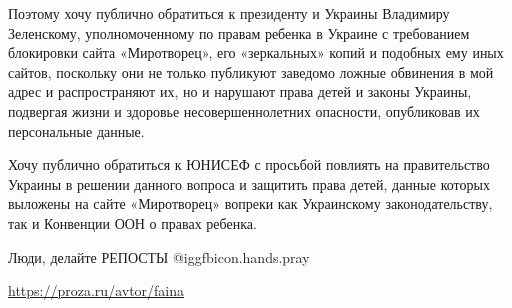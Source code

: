 Поэтому хочу публично обратиться к президенту и Украины Владимиру Зеленскому,
уполномоченному по правам ребенка в Украине с требованием блокировки сайта
«Миротворец», его «зеркальных» копий и подобных ему иных сайтов, поскольку они
не только публикуют заведомо ложные обвинения в мой адрес и распространяют их,
но и нарушают права детей и законы Украины, подвергая жизни и здоровье
несовершеннолетних опасности, опубликовав их персональные данные.

Хочу публично обратиться к ЮНИСЕФ с просьбой повлиять на правительство Украины
в решении данного вопроса и защитить права детей, данные которых выложены на
сайте «Миротворец» вопреки как Украинскому законодательству, так и Конвенции
ООН о правах ребенка.  

Люди, делайте РЕПОСТЫ @igg{fbicon.hands.pray} 

\url{https://proza.ru/avtor/faina}

